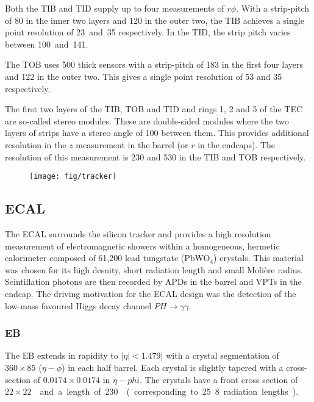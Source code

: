 Both the \ac{TIB} and \ac{TID} supply up to four measurements of $r\phi$. With a
strip-pitch of \unit{80}{\micro\metre} in the inner two layers and
\unit{120}{\micro\metre} in the outer two, the \ac{TIB} achieves a single point
resolution of \unit{23 and 35}{\micro\metre} respectively. In the \ac{TID}, the
strip pitch varies between \unit{100 and 141}{\micro\metre}.

The \ac{TOB} uses \unit{500}{\micro\metre} thick sensors with a strip-pitch of
\unit{183}{\micro\metre} in the first four layers and \unit{122}{\micro\metre} in
the outer two. This gives a single point resolution of \unit{53}{\micro\metre}
and \unit{35}{\micro\metre} respectively.

The first two layers of the \ac{TIB}, \ac{TOB} and \ac{TID} and rings 1, 2 and 5
of the \ac{TEC} are so-called stereo modules. These are double-sided modules
where the two layers of strips have a stereo angle of \unit{100}{\milli\radian}
between them. This provides additional resolution in the $z$ measurement in the
barrel (or $r$ in the endcaps). The resolution of this measurement is
\unit{230}{\micro\metre} and \unit{530}{\micro\metre} in the \ac{TIB} and
\ac{TOB} respectively.

\begin{figure}
\texttt{[image: fig/tracker]}
\end{figure}

\subsection{\acl{ECAL}}
The \ac{ECAL} surrounds the silicon tracker and provides a high resolution
measurement of electromagnetic showers within a homogeneous, hermetic
calorimeter composed of 61,200 lead tungstate (PbWO$_4$) crystals. This material
was chosen for its high desnity, short radiation length and small Moli\`{e}re
radius. Scintillation photons are then recorded by \ac{APD}s in the barrel and
\ac{VPT}s in the endcap. The driving motivation for the \ac{ECAL} design was the
detection of the low-mass favoured Higgs decay channel
$PH\longrightarrow\gamma\gamma$.

\subsubsection{\acl{EB}}
The \ac{EB} extends in rapidity to $|\eta|<1.479|$ with a crystal
segmentation of $360\times 85$ ($\eta-\phi$) in each half barrel. Each crystal
is slightly tapered with a cross-section of $0.0174\times0.0174$ in
$\eta-phi$. The crystals have a front cross section of \unit{$22\times
  22$}{\milli\metre\squared} and a length of \unit{230}{\milli\metre}
(corresponding to 25.8 radiation lengths).

